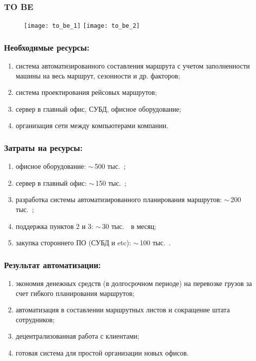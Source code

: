 \begin{frame}
  \frametitle{TO BE}
  \begin{center}
    \begin{figure}
      \texttt{[image: to\_be\_1]}
      \texttt{[image: to\_be\_2]}
    \end{figure}
  \end{center}
\end{frame}

\begin{frame}
  \frametitle{Необходимые ресурсы:}
  \begin{enumerate}
    \item система автоматизированного составления маршрута с учетом
      заполненности машины на весь маршрут, сезонности и др. факторов;
    \item система проектирования рейсовых маршрутов;
    \item сервер в главный офис, СУБД, офисное оборудование;
    \item организация сети между компьютерами компании.
  \end{enumerate}
\end{frame}

\begin{frame}
  \frametitle{Затраты на ресурсы:}
  \begin{enumerate}
    \item офисное оборудование: \( \sim\, \)500 тыс.~\rouble;
    \item сервер в главный офис: \( \sim\, \)150 тыс.~\rouble;
    \item разработка системы автоматизированного планирования маршрутов:
      \( \sim\, \)200 тыс.~\rouble;
    \item поддержка пунктов 2 и 3: \( \sim\, \)30 тыс.~\rouble\ в месяц;
    \item закупка стороннего ПО (СУБД и etc): \( \sim\, \)100 тыс.~\rouble.
  \end{enumerate}
\end{frame}

\begin{frame}
  \frametitle{Результат автоматизации:}
  \begin{enumerate}
    \item экономия денежных средств (в долгосрочном периоде) на перевозке
      грузов за счет гибкого планирования маршрутов;
    \item автоматизация в составлении маршрутных листов и сокращение штата
      сотрудников;
    \item децентрализованная работа с клиентами;
    \item готовая система для простой организации новых офисов.
  \end{enumerate}
\end{frame}